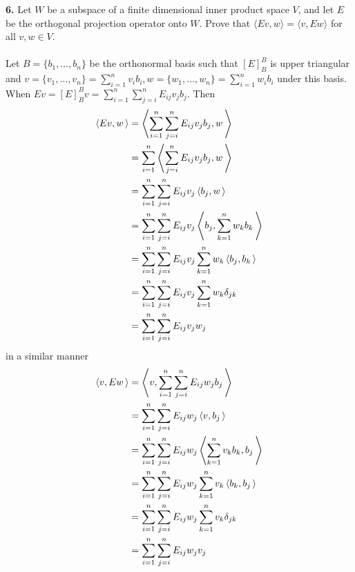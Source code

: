 \documentclass[11pt]{amsart}
\theoremstyle{definition}  %
\begin{document}
\newpage
\vskip 0.1cm
\noindent
{\bf 6.} Let $W$ be a subspace of a finite dimensional inner product space $V$, and let $E$ be the orthogonal projection operator onto $W$. Prove that
$\langle Ev, w \rangle = \langle v, Ew\rangle$ for all $v,w \in V$. \\
\\
Let $B=\{ b_1,\dots, b_n\}$ be the orthonormal basis such that $[E]_B^B$ is upper triangular and $v=\{v_1, \dots, v_n\}=\sum_{i=1}^n v_ib_i, w=\{w_1, \dots, w_n\}=\sum_{i=1}^n w_ib_i $ under this basis.  When $Ev = [E]_B^B v = \sum_{i=1}^n \sum_{j=i}^n E_{ij}v_jb_j$. Then
\begin{align*}
	\left\langle Ev,w \,\right\rangle &= \left\langle \sum_{i=1}^n \sum_{j=i}^n E_{ij}v_jb_j, w \,\right\rangle\\
	&= \sum_{i=1}^n \left\langle \sum_{j=i}^n E_{ij}v_jb_j, w \,\right\rangle \\
	&= \sum_{i=1}^n \sum_{j=i}^n E_{ij}v_j\left\langle b_j, w \,\right\rangle \\
	&= \sum_{i=1}^n \sum_{j=i}^n E_{ij}v_j\left\langle b_j, \sum_{k=1}^n w_kb_k \,\right\rangle \\
	&= \sum_{i=1}^n \sum_{j=i}^n E_{ij}v_j\sum_{k=1}^n w_k\left\langle b_j, b_k \,\right\rangle \\
	&= \sum_{i=1}^n \sum_{j=i}^n E_{ij}v_j\sum_{k=1}^n w_k\delta_{jk} \\
	&= \sum_{i=1}^n \sum_{j=i}^n E_{ij}v_j w_j
\end{align*}in a similar manner
\begin{align*}
	\left\langle v, Ew \,\right\rangle &= \left\langle v, \sum_{i=1}^n \sum_{j=i}^n E_{ij}w_jb_j \,\right\rangle \\
	&= \sum_{i=1}^n \sum_{j=i}^n E_{ij}w_j\left\langle v, b_j \,\right\rangle \\
	&= \sum_{i=1}^n \sum_{j=i}^n E_{ij}w_j\left\langle \sum_{k=1}^n v_kb_k, b_j \,\right\rangle \\
	&= \sum_{i=1}^n \sum_{j=i}^n E_{ij}w_j\sum_{k=1}^n v_k\left\langle b_k, b_j \,\right\rangle \\
	&= \sum_{i=1}^n \sum_{j=i}^n E_{ij}w_j\sum_{k=1}^n v_k\delta_{jk} \\
	&= \sum_{i=1}^n \sum_{j=i}^n E_{ij}w_j v_j
\end{align*}
\\
\end{document}
